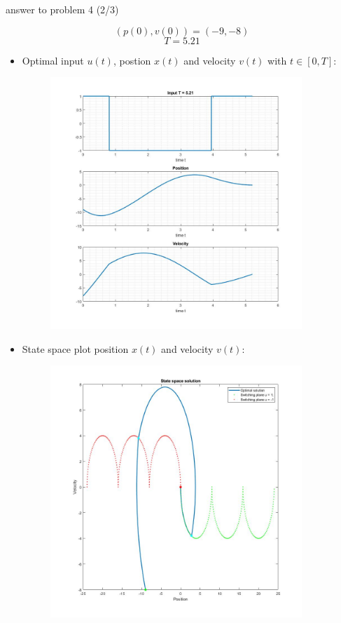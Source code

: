 \documentclass[a4paper]{article}
\begin{document}
	\newpage
	\thispagestyle{empty}
	\noindent	\hrulefill
	\begin{flushright}
		answer to problem 4 (2/3)
	\end{flushright}
	\noindent	\hrulefill
	$$(p(0),v(0))=(-9,-8)$$
	$$T=5.21$$
	\begin{itemize}
		\item[] Optimal input $u(t)$, postion $x(t)$ and velocity $v(t)$ with $t \in [0,T]$:
		\begin{figure}[h!]
			\centering
			\includegraphics[width=9.5cm]{Solution_init2}
		\end{figure}
		\item[] State space plot position $x(t)$ and velocity $v(t)$:
		\begin{figure}[h!]
			\centering
			\includegraphics[width=9.5cm]{Statespace_init2}
		\end{figure}
	\end{itemize}
\end{document}
